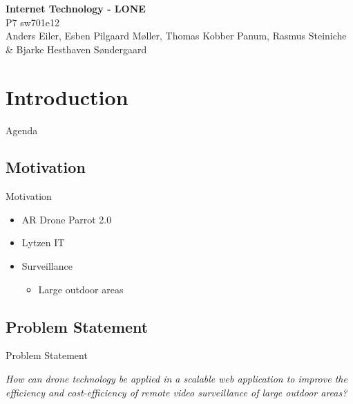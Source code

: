 \author{Rasmus Steiniche}
\begin{frame}{}
	\begin{center}
		\huge \textbf{Internet Technology - LONE}\\
		\normalsize P7 sw701e12\\
		\tiny{Anders Eiler, Esben Pilgaard Møller, Thomas Kobber Panum,}
		\tiny{Rasmus Steiniche \& Bjarke Hesthaven Søndergaard}
	\end{center}
\end{frame}

\section{Introduction}
\begin{frame}{Agenda}{}
\tableofcontents
\end{frame}

\subsection{Motivation}
\begin{frame}{Motivation}
\begin{itemize}
	\item AR Drone Parrot 2.0
	\item Lytzen IT
	\item Surveillance
	\begin{itemize}
		\item Large outdoor areas
	\end{itemize}
\end{itemize}
\end{frame}

\subsection{Problem Statement}
\begin{frame}{Problem Statement}
\begin{center}
	\textit{How can drone technology be applied in a scalable web application to improve the efficiency and cost-efficiency of remote video surveillance of large outdoor areas?}
\end{center}
\end{frame}